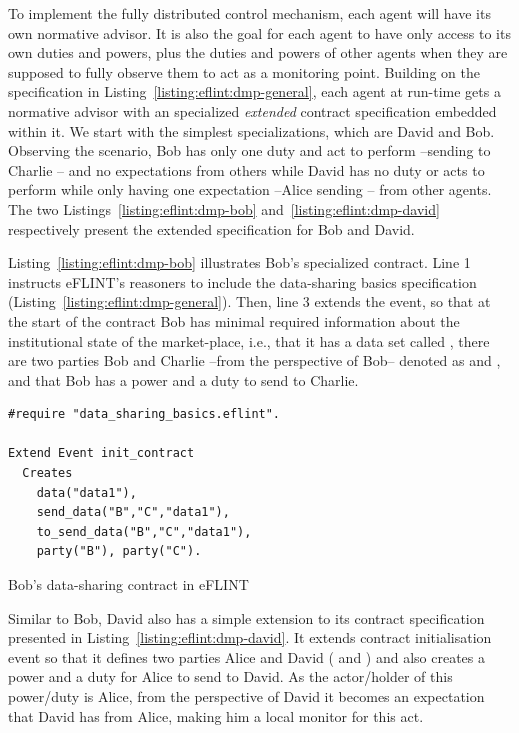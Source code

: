 To implement the fully distributed control mechanism, each agent will have its own normative advisor. It is also the goal for each agent to have only access to its own duties and powers, plus the duties and powers of other agents when they are supposed to fully observe them to act as a monitoring point. Building on the specification in Listing~\ref{listing:eflint:dmp-general}, each agent at run-time gets a normative advisor with an specialized \textit{extended} contract specification embedded within it. We start with the simplest specializations, which are David and Bob. Observing the scenario, Bob has only one duty and act to perform --sending  to Charlie -- and no expectations from others while David has no duty or acts to perform while only having one expectation --Alice sending -- from other agents. The two Listings~\ref{listing:eflint:dmp-bob} and~\ref{listing:eflint:dmp-david} respectively present the extended specification for Bob and David.


Listing~\ref{listing:eflint:dmp-bob} illustrates Bob's specialized contract. Line 1 instructs eFLINT's reasoners to include the data-sharing basics specification (Listing~\ref{listing:eflint:dmp-general}). Then, line 3 extends the  event, so that at the start of the contract Bob has minimal required information about the institutional state of the market-place, i.e., that it has a data set called , there are two parties Bob and Charlie --from the perspective of Bob-- denoted as  and , and that Bob has a power and a duty to send  to Charlie.

\begin{listing}[th]
\centering
\begin{tcolorbox}[left=2pt,right=2pt,top=2pt,bottom=2pt]
\begin{verbatim}
#require "data_sharing_basics.eflint".

Extend Event init_contract
  Creates 
    data("data1"),
    send_data("B","C","data1"),
    to_send_data("B","C","data1"),
    party("B"), party("C").
\end{verbatim}
\end{tcolorbox}
\caption{Bob's data-sharing contract in eFLINT}
\label{listing:eflint:dmp-bob}
\end{listing}



Similar to Bob, David also has a simple extension to its contract specification presented in Listing~\ref{listing:eflint:dmp-david}. It extends contract initialisation event so that it defines two parties Alice and David ( and ) and also creates a power and a duty for Alice to send  to David. As the actor/holder of this power/duty is Alice, from the perspective of David it becomes an expectation that David has from Alice, making him a local monitor for this act.

